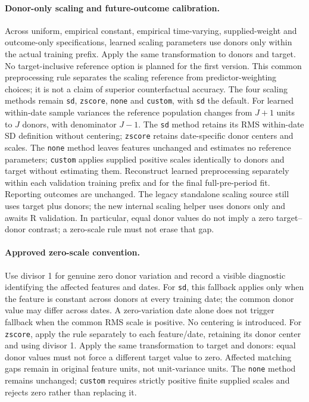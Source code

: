 \documentclass[11pt]{article}
\begin{document}
\paragraph{Donor-only scaling and future-outcome calibration.}
Across uniform, empirical constant, empirical time-varying, supplied-weight
and outcome-only specifications, learned scaling parameters use donors
only within the actual training prefix. Apply the same transformation to
donors and target. No target-inclusive reference option is planned for
the first version. This common preprocessing rule separates the scaling
reference from predictor-weighting choices; it is not a claim of superior
counterfactual accuracy. The four scaling
methods remain \texttt{sd}, \texttt{zscore}, \texttt{none} and
\texttt{custom}, with \texttt{sd} the default. For learned within-date
sample variances the reference population changes from $J+1$ units to
$J$ donors, with denominator $J-1$. The \texttt{sd} method retains its
RMS within-date SD definition without centering; \texttt{zscore} retains
date-specific donor centers and scales. The \texttt{none} method leaves
features unchanged and estimates no reference parameters; \texttt{custom}
applies supplied positive scales identically to donors and target without
estimating them. Reconstruct learned preprocessing separately within each
validation training prefix and for the final full-pre-period fit.
Reporting outcomes are unchanged.
The legacy standalone scaling source still uses target plus donors; the
new internal scaling helper uses donors only and awaits R validation.
In particular, equal donor values do not imply a
zero target--donor contrast; a zero-scale rule must not erase that gap.

\paragraph{Approved zero-scale convention.}
Use divisor 1 for genuine zero donor variation and record a visible
diagnostic identifying the affected features and dates. For \texttt{sd},
this fallback applies only when the feature is constant across donors at
every training date; the common donor value may differ across dates.
A zero-variation date alone does not trigger fallback when the common RMS
scale is positive. No centering is introduced. For \texttt{zscore}, apply
the rule separately to each feature/date, retaining its donor center and
using divisor 1. Apply the same transformation to target and donors:
equal donor values must not force a different target value to zero.
Affected matching gaps remain in original feature units, not unit-variance
units. The \texttt{none} method remains unchanged; \texttt{custom} requires
strictly positive finite supplied scales and rejects zero rather than
replacing it.
\end{document}
